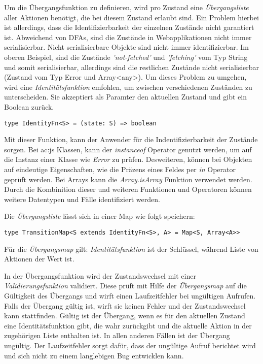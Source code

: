 Um die Übergangsfunktion zu definieren, wird pro Zustand eine \textit{Übergangsliste} aller Aktionen benötigt, die bei diesem Zustand erlaubt sind. Ein Problem hierbei ist allerdings, dass die Identifizierbarkeit der einzelnen Zustände nicht garantiert ist.
Abweichend von DFAs, sind die Zustände in Webapplikationen nicht immer serialisierbar. Nicht serialisierbare Objekte sind nicht immer identifizierbar. Im oberen Beispiel, sind die Zustände \textit{'not-fetched'} und \textit{'fetching'} vom Typ String und somit serialisierbar, allerdings sind die restlichen Zustände nicht serialisierbar (Zustand vom Typ Error und Array<any>). Um dieses Problem zu umgehen, wird eine \textit{Identitätsfunktion} emfohlen, um zwischen verschiedenen Zuständen zu unterscheiden. Sie akzeptiert als Paramter den aktuellen Zustand und gibt ein Boolean zurück.

\begin{lstlisting}
type IdentityFn<S> = (state: S) => boolean
\end{lstlisting}


Mit dieser Funktion, kann der Anwender für die Indentifizierbarkeit der Zustände sorgen. Bei \acrlong{ac:js} Klassen, kann der \textit{instanceof} Operator genutzt werden, um auf die Instanz einer Klasse wie \textit{Error} zu prüfen.\cite{jsInstanceofOperator} Desweiteren, können bei Objekten auf eindeutige Eigenschaften, wie die Präzens eines Feldes per \textit{in} Operator geprüft werden.\cite{jsInOperator} Bei Arrays kann die \textit{Array.isArray} Funktion verwendet werden.\cite{jsIsArray} Durch die Kombinition dieser und weiteren Funktionen und Operatoren können weitere Datentypen und Fälle identifiziert werden.

Die \textit{Übergangsliste} lässt sich in einer Map wie folgt speichern:

\begin{lstlisting}
type TransitionMap<S extends IdentityFn<S>, A> = Map<S, Array<A>>
\end{lstlisting}

Für die \textit{Übergangsmap} gilt: \textit{Identitätsfunktion} ist der Schlüssel, während Liste von Aktionen der Wert ist.

In der Übergangsfunktion wird der Zustandswechsel mit einer \textit{Validierungsfunktion} validiert. Diese prüft mit Hilfe der \textit{Übergangsmap} auf die Gültigkeit des Übergangs und wirft einen Laufzeitfehler bei ungültigen Aufrufen. Falls der Übergang gültig ist, wirft sie keinen Fehler und der Zustandswechsel kann stattfinden. Gültig ist der Übergang, wenn es für den aktuellen Zustand eine Identitätsfunktion gibt, die wahr zurückgibt und die aktuelle Aktion in der zugehörigen Liste enthalten ist. In allen anderen Fällen ist der Übergang ungültig.
Der Laufzeitfehler sorgt dafür, dass der ungültige Aufruf berichtet wird und sich nicht zu einem langlebigen Bug entwicklen kann.

